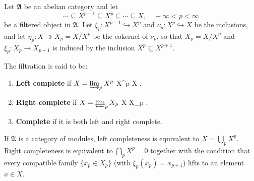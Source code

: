 Let $\mathfrak{A}$ be an abelian category and let
$$\cdots \subseteq X^{p-1} \subseteq X^p \subseteq \cdots \subseteq X, \quad -\infty < p < \infty$$
be a filtered object in $\mathfrak{A}$. Let $\xi_p : X^{p-1} \hookrightarrow X^p$ and $\nu_p : X^p \hookrightarrow X$ be the inclusions, and let $\eta_p : X \twoheadrightarrow X_p = X/X^p$ be the cokernel of $\nu_p$, so that $X_p = X/X^p$ and $\xi_p : X_p \to X_{p+1}$ is induced by the inclusion $X^p \subseteq X^{p+1}$.

The filtration is said to be:
\begin{enumerate}
\item \textbf{Left complete} if $X = \varinjlim_p X^p$  \varinjlim X^p \to X .
\item \textbf{Right complete} if $X = \varprojlim_p X_p$  X \to \varprojlim X_p .
\item \textbf{Complete} if it is both left and right complete.
\end{enumerate}

If $\mathfrak{A}$ is a category of modules, left completeness is equivalent to $X = \bigcup_p X^p$. Right completeness is equivalent to $\bigcap_p X^p = 0$ together with the condition that every compatible family $\{x_p \in X_p\}$ (with $\xi_p(x_p) = x_{p+1}$) lifts to an element $x \in X$.
